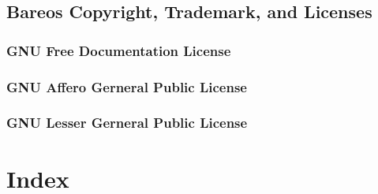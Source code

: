 \documentclass[10pt,a4paper]{book}
\begin{document}




\chapter{Bareos Copyright, Trademark, and Licenses}
\label{LicenseChapter}

    

\pagebreak
\section{GNU Free Documentation License}
    \label{fdl}
    

\pagebreak
\section{GNU Affero Gerneral Public License}
    \label{agpl}
    

\pagebreak
\section{GNU Lesser Gerneral Public License}
    \label{lgpl}
    

\part{Index}
\printindex[general]
\printindex[dir]
\printindex[sd]
\printindex[fd]
\printindex[console]
\printindex[monitor]
\end{document}
